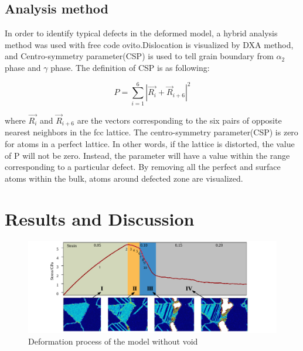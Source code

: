 \documentclass[Unknown,article,submit,moreauthors,pdftex,10pt,a4paper]{Definitions/mdpi}
\begin{document}
\subsection{Analysis method}
In order to identify typical defects in the deformed model, a hybrid analysis method was used with free code ovito\cite{Stukowski2010a}.Dislocation is visualized by DXA method, and Centro-symmetry parameter(CSP) is used to tell grain boundary from  $\alpha_2$ phase and $\gamma$ phase. The definition of CSP is as following:

	\begin{equation} \label{eq:csp} 
	P = \displaystyle\sum_{i=1}^{6}|\vec{R_i}+{\vec{R}}_{i+6}|^2
	\end{equation}
	
where $\vec{R_i}$ and ${\vec{R}}_{i+6}$ are the vectors corresponding to the six pairs of opposite nearest neighbors in the fcc lattice. The centro-symmetry parameter(CSP) is zero for atoms in a perfect lattice. In other words, if the lattice is distorted, the value of P will not be zero. Instead, the parameter will have a value within the range corresponding to a particular defect. By removing all the perfect and surface atoms within the bulk, atoms around defected zone are visualized. 
 
\section{Results and Discussion}\label{section:RD}

\begin{figure}[ht]
	\centering
	\includegraphics[width=1\linewidth]{img/tens}
	\caption{Deformation process of the model without void}
	\label{fig:deformation-pf}
\end{figure}
\end{document}
